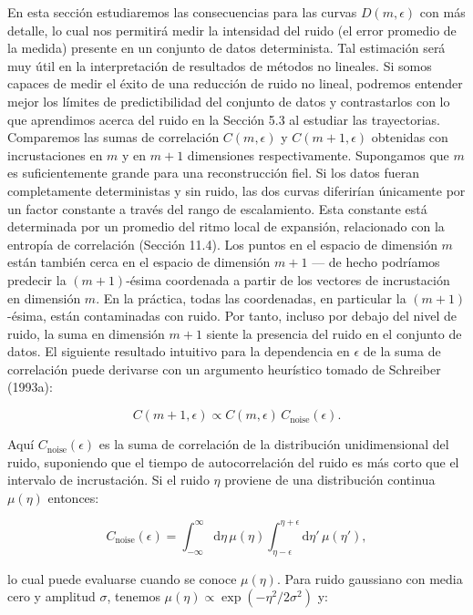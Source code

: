 \documentclass[10pt,a4paper]{book}
\begin{document}
En esta sección estudiaremos las consecuencias para las curvas $D(m, \epsilon)$ con más detalle, lo cual nos permitirá medir la intensidad del ruido (el error promedio de la medida) presente en un conjunto de datos determinista. Tal estimación será muy útil en la interpretación de resultados de métodos no lineales. Si somos capaces de medir el éxito de una reducción de ruido no lineal, podremos entender mejor los límites de predictibilidad del conjunto de datos y contrastarlos con lo que aprendimos acerca del ruido en la Sección 5.3 al estudiar las trayectorias. Comparemos las sumas de correlación $C(m, \epsilon)$ y $C(m+1, \epsilon)$ obtenidas con incrustaciones en $m$ y en $m+1$ dimensiones respectivamente. Supongamos que $m$ es suficientemente grande para una reconstrucción fiel. Si los datos fueran completamente deterministas y sin ruido, las dos curvas diferirían únicamente por un factor constante a través del rango de escalamiento. Esta constante está determinada por un promedio del ritmo local de expansión, relacionado con la entropía de correlación (Sección 11.4). Los puntos en el espacio de dimensión $m$ están también cerca en el espacio de dimensión $m+1$ — de hecho podríamos predecir la $(m+1)$-ésima coordenada a partir de los vectores de incrustación en dimensión $m$. En la práctica, todas las coordenadas, en particular la $(m+1)$-ésima, están contaminadas con ruido. Por tanto, incluso por debajo del nivel de ruido, la suma en dimensión $m+1$ siente la presencia del ruido en el conjunto de datos. El siguiente resultado intuitivo para la dependencia en $\epsilon$ de la suma de correlación puede derivarse con un argumento heurístico tomado de Schreiber (1993a):

\begin{equation}
C(m+1, \epsilon) \propto C(m, \epsilon) \, C_\text{noise}(\epsilon).
\end{equation}

Aquí $C_\text{noise}(\epsilon)$ es la suma de correlación de la distribución unidimensional del ruido, suponiendo que el tiempo de autocorrelación del ruido es más corto que el intervalo de incrustación. Si el ruido $\eta$ proviene de una distribución continua $\mu(\eta)$ entonces:

\begin{equation}
C_\text{noise}(\epsilon) = \int_{-\infty}^{\infty} \mathrm{d}\eta\, \mu(\eta) \int_{\eta - \epsilon}^{\eta + \epsilon} \mathrm{d}\eta'\, \mu(\eta'),
\end{equation}

lo cual puede evaluarse cuando se conoce $\mu(\eta)$. Para ruido gaussiano con media cero y amplitud $\sigma$, tenemos $\mu(\eta) \propto \exp(-\eta^2/2\sigma^2)$ y:
\end{document}
